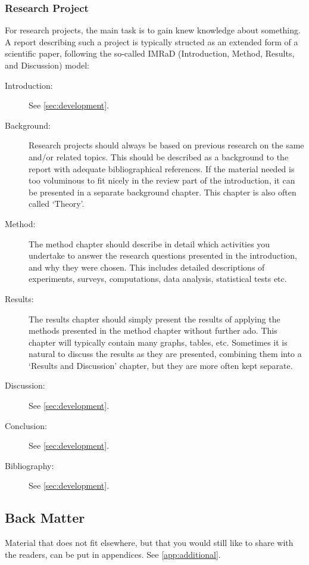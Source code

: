 \subsubsection{Research Project}
\label{sec:resesarch}

For research projects, the main task is to gain knew knowledge about something. A report describing such a project is typically structed as an extended form of a scientific paper, following the so-called IMRaD (Introduction, Method, Results, and Discussion) model:

\begin{description}
    \item[Introduction:] See \cref{sec:development}.
    \item[Background:] Research projects should always be based on previous research on the same and/or related topics. This should be described as a background to the report with adequate bibliographical references. If the material needed is too voluminous to fit nicely in the review part of the introduction, it can be presented in a separate background chapter. This chapter is also often called `Theory'.
    \item[Method:] The method chapter should describe in detail which activities you undertake to answer the research questions presented in the introduction, and why they were chosen. This includes detailed descriptions of experiments, surveys, computations, data analysis, statistical tests etc.
    \item[Results:] The results chapter should simply present the results of applying the methods presented in the method chapter without further ado. This chapter will typically contain many graphs, tables, etc. Sometimes it is natural to discuss the results as they are presented, combining them into a `Results and Discussion' chapter, but they are more often kept separate.
    \item[Discussion:] See \cref{sec:development}.
    \item[Conclusion:] See \cref{sec:development}.
    \item[Bibliography:] See \cref{sec:development}.
\end{description}

\subsection{Back Matter}

Material that does not fit elsewhere, but that you would still like to share with the readers, can be put in appendices. See \cref{app:additional}.
